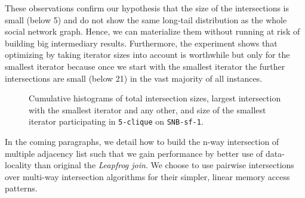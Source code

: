 These observations confirm our hypothesis that the size of the intersections is small (below 5) and do not show the same long-tail
distribution as the whole social network graph.
Hence, we can materialize them without running at risk of building big intermediary results.
Furthermore, the experiment shows that optimizing by taking iterator sizes into account is worthwhile but only for the smallest iterator
because
once we start with the smallest iterator the further intersections are small (below 21) in the vast majority of all instances.


\begin{figure}[H]
\centering
{}
\hfill
{}
\hfill
{}
\caption{Cumulative histograms of total intersection sizes, largest intersection with the smallest iterator and any other, and size of the
smallest iterator participating in \texttt{5-clique} on \texttt{SNB-sf-1}.}
\label{fig:intersection-workload}
\end{figure}

In the coming paragraphs, we detail how to build the n-way intersection of multiple adjacency list
such that we gain performance by better use of data-locality than original the \textit{Leapfrog join}.
We choose to use pairwise intersections over multi-way intersection algorithms for their simpler,
linear memory access patterns.

